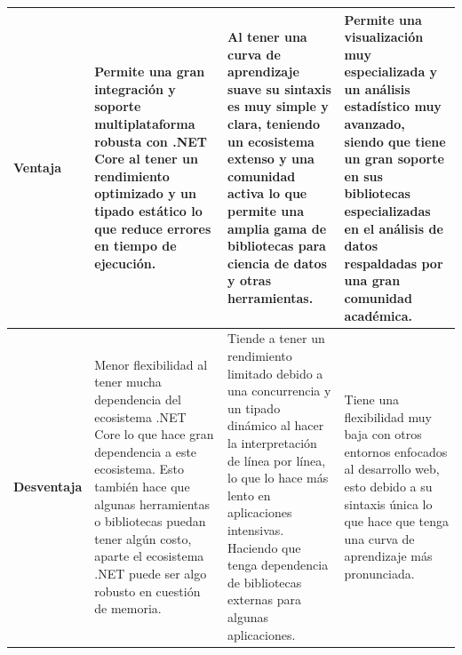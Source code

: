 \begin{landscape}
\begin{table}[h!]
\begin{tabular}{|>{\raggedright\arraybackslash}p{2.5cm}|>{\raggedright\arraybackslash}p{6.7cm}|>{\raggedright\arraybackslash}p{7cm}|>{\raggedright\arraybackslash}p{6.7cm}|}
    \hline
    \textbf{Ventaja} & 
    Permite una gran integración y soporte multiplataforma robusta con .NET Core al tener un rendimiento optimizado y un tipado estático lo que reduce errores en tiempo de ejecución.
    & 
    Al tener una curva de aprendizaje suave su sintaxis es muy simple y clara, teniendo un ecosistema extenso y una comunidad activa lo que permite una amplia gama de bibliotecas para ciencia de datos y otras herramientas.
    & 
    Permite una visualización muy especializada y un análisis estadístico muy avanzado, siendo que tiene un gran soporte en sus bibliotecas especializadas en el análisis de datos respaldadas por una gran comunidad académica.
    \\
    \hline
    \textbf{Desventaja} & 
    Menor flexibilidad al tener mucha dependencia del ecosistema .NET Core lo que hace gran dependencia a este ecosistema. Esto también hace que algunas herramientas o bibliotecas puedan tener algún costo, aparte el ecosistema .NET puede ser algo robusto en cuestión de memoria.
    & 
    Tiende a tener un rendimiento limitado debido a una concurrencia y un tipado dinámico al hacer la interpretación de línea por línea, lo que lo hace más lento en aplicaciones intensivas. Haciendo que tenga dependencia de bibliotecas externas para algunas aplicaciones.
    & 
    Tiene una flexibilidad muy baja con otros entornos enfocados al desarrollo web, esto debido a su sintaxis única lo que hace que tenga una curva de aprendizaje más pronunciada.
    \\
    \hline
    \end{tabular}

\end{table}

\endgroup
\end{landscape}

